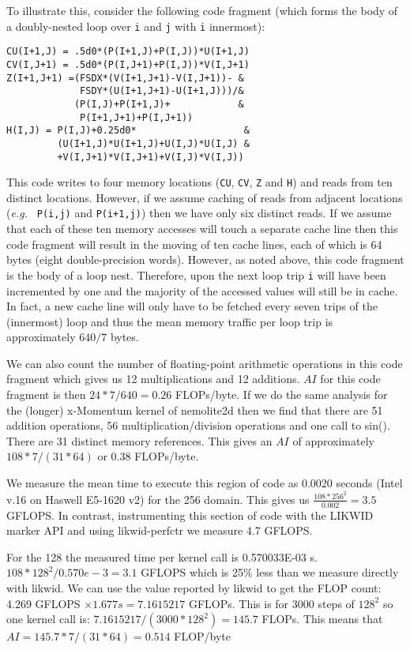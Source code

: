 \documentclass[12pt]{article}
\begin{document}
To illustrate this, consider the following code fragment (which forms
the body of a doubly-nested loop over {\tt i} and {\tt j} with {\tt i}
innermost):
\begin{verbatim}
CU(I+1,J) = .5d0*(P(I+1,J)+P(I,J))*U(I+1,J)
CV(I,J+1) = .5d0*(P(I,J+1)+P(I,J))*V(I,J+1)
Z(I+1,J+1) =(FSDX*(V(I+1,J+1)-V(I,J+1))- &
             FSDY*(U(I+1,J+1)-U(I+1,J)))/&
            (P(I,J)+P(I+1,J)+            &
             P(I+1,J+1)+P(I,J+1))
H(I,J) = P(I,J)+0.25d0*                   &
         (U(I+1,J)*U(I+1,J)+U(I,J)*U(I,J) & 
         +V(I,J+1)*V(I,J+1)+V(I,J)*V(I,J))
\end{verbatim}
This code writes to four memory locations ({\tt CU}, {\tt CV}, {\tt Z}
and {\tt H}) and reads from ten distinct locations.  However, if we
assume caching of reads from adjacent locations ({\it e.g.} {\tt
  P(i,j)} and {\tt P(i+1,j)}) then we have only six distinct reads.
If we assume that each of these ten memory accesses will touch a
separate cache line then this code fragment will result in the moving
of ten cache lines, each of which is 64 bytes (eight double-precision
words). However, as noted above, this code fragment is the body of a
loop nest. Therefore, upon the next loop trip {\tt i} will have been
incremented by one and the majority of the accessed values will still
be in cache. In fact, a new cache line will only have to be fetched
every seven trips of the (innermost) loop and thus the mean memory
traffic per loop trip is approximately $640/7$ bytes.

We can also count the number of floating-point arithmetic operations
in this code fragment which gives us 12 multiplications and 12
additions. $AI$ for this code fragment is then $24*7/640 = 0.26$
FLOPs/byte.  If we do the same analysis for the (longer) x-Momentum
kernel of nemolite2d then we find that there are 51 addition
operations, 56 multiplication/division operations and one call to
sin(). There are 31 distinct memory references. This gives an $AI$ of
approximately $108*7/(31*64)$ or 0.38 FLOPs/byte.

We measure the mean time to execute this region of code as 0.0020
seconds (Intel v.16 on Haswell E5-1620 v2) for the 256 domain. This
gives us $\frac{108*256^2}{0.002} = 3.5$ GFLOPS. In contrast,
instrumenting this section of code with the LIKWID marker API and
using likwid-perfctr we measure 4.7 GFLOPS.

For the 128 the measured time per kernel call is 0.570033E-03 s.
$108*128^2/0.570e-3 = 3.1$ GFLOPS which is 25\% less than we measure
directly with likwid.  We can use the value reported by likwid to get
the FLOP count: 4.269 GFLOPS $\times 1.677 s = 7.1615217$ GFLOPs. This is for
3000 steps of $128^2$ so one kernel call is: $7.1615217/(3000*128^2) =
145.7$ FLOPs. This means that $AI = 145.7*7/(31*64) = 0.514$ FLOP/byte
\end{document}
